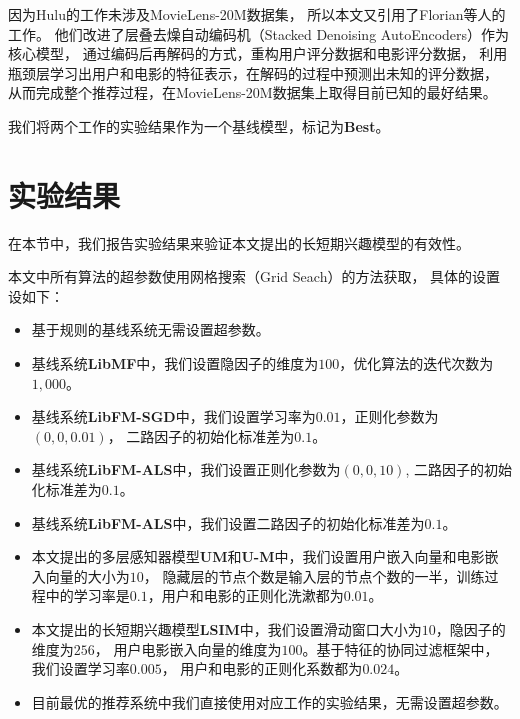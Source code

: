 因为Hulu的工作未涉及MovieLens-20M数据集，
所以本文又引用了Florian等人\parencite{strub2016hybrid}的工作。
他们改进了层叠去燥自动编码机（Stacked Denoising AutoEncoders）作为核心模型，
通过编码后再解码的方式，重构用户评分数据和电影评分数据，
利用瓶颈层学习出用户和电影的特征表示，在解码的过程中预测出未知的评分数据，
从而完成整个推荐过程，在MovieLens-20M数据集上取得目前已知的最好结果。

我们将两个工作的实验结果作为一个基线模型，标记为\textbf{Best}。

\section{实验结果}
在本节中，我们报告实验结果来验证本文提出的长短期兴趣模型的有效性。

本文中所有算法的超参数使用网格搜索（Grid Seach）的方法获取，
具体的设置设如下：
\begin{itemize}
\item
基于规则的基线系统无需设置超参数。
\item
基线系统\textbf{LibMF}中，我们设置隐因子的维度为$100$，优化算法的迭代次数为$1,000$。
\item
基线系统\textbf{LibFM-SGD}中，我们设置学习率为$0.01$，正则化参数为$(0,0,0.01)$，
二路因子的初始化标准差为$0.1$。
\item
基线系统\textbf{LibFM-ALS}中，我们设置正则化参数为$(0,0,10)$,
二路因子的初始化标准差为$0.1$。
\item
基线系统\textbf{LibFM-ALS}中，我们设置二路因子的初始化标准差为$0.1$。
\item
本文提出的多层感知器模型\textbf{UM}和\textbf{U-M}中，我们设置用户嵌入向量和电影嵌入向量的大小为$10$，
隐藏层的节点个数是输入层的节点个数的一半，训练过程中的学习率是$0.1$，用户和电影的正则化洗漱都为$0.01$。
\item
本文提出的长短期兴趣模型\textbf{LSIM}中，我们设置滑动窗口大小为$10$，隐因子的维度为$256$，
用户电影嵌入向量的维度为$100$。基于特征的协同过滤框架中，我们设置学习率$0.005$，
用户和电影的正则化系数都为$0.024$。
\item
目前最优的推荐系统中我们直接使用对应工作的实验结果，无需设置超参数。
\end{itemize}

